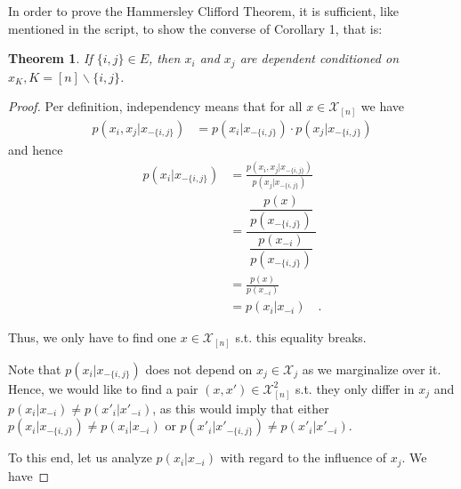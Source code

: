 \documentclass{article}
\theoremstyle{plain}
\newtheorem{theorem}{Theorem}
\begin{document}
\noindent
In order to prove the Hammersley Clifford Theorem, it is sufficient, like mentioned in the script, to show the converse of Corollary 1, that is:

\begin{theorem}
    If $\{i,j\} \in E$, then $x_i$ and $x_j$ are dependent conditioned on $x_K, K = [n] \backslash \{i,j\}$.
\end{theorem}

\begin{proof}
    Per definition, independency means that for all $x \in \mathcal{X}_{[n]}$ we have
    \begin{align*}
        p(x_i, x_j | x_{-\{i,j\}}) &= p(x_i | x_{-\{i,j\}}) \cdot p(x_j | x_{-\{i,j\}})
    \end{align*}
    and hence
    \begin{align*}
        p(x_i | x_{-\{i,j\}}) &= \frac{p(x_i, x_j | x_{-\{i,j\}})}{p(x_j | x_{-\{i,j\}})} \\
        &= \dfrac{\ \dfrac{p(x)}{p(x_{-\{i,j\}})}\ }{\dfrac{p(x_{-i})}{p(x_{-\{i,j\}})}} \\
        &= \frac{p(x)}{p(x_{-i})} \\
        &= p(x_i | x_{-i}) \quad .
    \end{align*}

    \medskip
    \noindent
    Thus, we only have to find one $x \in \mathcal{X}_{[n]}$ s.t. this equality breaks.

    \medskip \noindent
    Note that $p(x_i | x_{-\{i,j\}})$ does not depend on $x_j \in \mathcal{X}_j$ as we marginalize over it. Hence, we would like to find a pair $(x, x') \in \mathcal{X}_{[n]}^2$ s.t. they only differ in $x_j$ and $p(x_i | x_{-i}) \neq p(x'_i | x'_{-i})$, as this would imply that either $p(x_i | x_{-\{i,j\}}) \neq p(x_i | x_{-i})$ or $p(x'_i | x'_{-\{i,j\}}) \neq p(x'_i | x'_{-i})$.

    \medskip \noindent
    To this end, let us analyze $p(x_i | x_{-i})$ with regard to the influence of $x_j$. We have


\end{proof}
\end{document}
